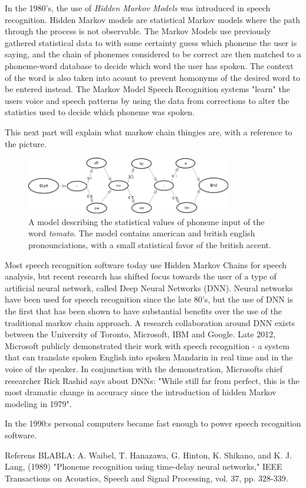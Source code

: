 In the 1980's, the use of \emph{Hidden Markov Models} was introduced in speech recognition\cite{rabiner1986introduction}. Hidden Markov models are statistical Markov models where the path through the process is not observable. The Markov Models use previously gathered statistical data to with some certainty guess which phoneme the user is saying, and the chain of phonemes considered to be correct are then matched to a phoneme-word database to decide which word the user has spoken. The context of the word is also taken into acount to prevent homonyms of the desired word to be entered instead. The Markov Model Speech Recognition systems "learn" the users voice and speech patterns by using the data from corrections to alter the statistics used to decide which phoneme was spoken. 

This next part will explain what markow chain thingies are, with a reference to the picture.

\begin{figure}[]
\includegraphics[width=0.8\textwidth] {bilder/tomato.jpg}
\caption{A model describing the statistical values of phoneme input of the word \emph{tomato}. The model contains american and british english pronounciations, with a small statistical favor of the british accent.}
\label{ibooks}
\end{figure}

Most speech recognition software today use Hidden Markov Chains for speech analysis\cite{DNN}, but recent research has shifted focus towards the user of a type of artificial neural network, called Deep Neural Networks (DNN). Neural networks have been used for speech recognition since the late 80's, but the use of DNN is the first that has been shown to have substantial benefits over the use of the traditional markov chain approach. A research collaboration around DNN exists between the University of Toronto, Microsoft, IBM and Google. Late 2012, Microsoft publicly demonstrated their work with speech recognition - a system that can translate spoken English into spoken Mandarin in real time and in the voice of the speaker. In conjunction with the demonstration, Microsofts chief researcher Rick Rashid says about DNNs: "While still far from perfect, this is the most dramatic change in accuracy since the introduction of hidden Markov modeling in 1979"\cite{chin}.

In the 1990:s personal computers became fast enough to power speech recognition software.

Referens BLABLA:
A. Waibel, T. Hanazawa, G. Hinton, K. Shikano, and K. J. Lang, (1989) "Phoneme recognition using time-delay neural networks," IEEE Transactions on Acoustics, Speech and Signal Processing, vol. 37, pp. 328-339. 
